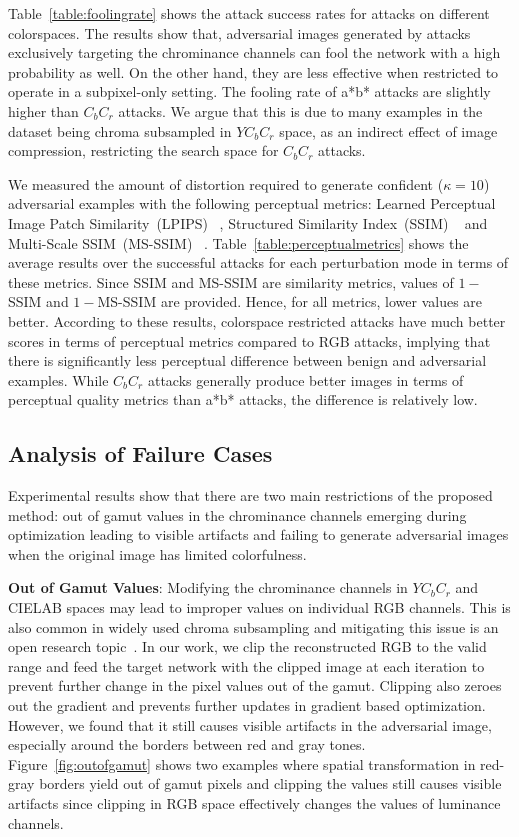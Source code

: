 Table~\ref*{table:foolingrate} shows the attack success rates for attacks on different colorspaces. The results show that, adversarial images generated by attacks exclusively targeting the chrominance channels can fool the network with a high probability as well. On the other hand, they are less effective when restricted to operate in a subpixel-only setting. The fooling rate of a*b* attacks are slightly higher than \(C_bC_r\) attacks. We argue that this is due to many examples in the dataset being chroma subsampled in \(YC_bC_r\) space, as an indirect effect of image compression, restricting the search space for \(C_bC_r\) attacks.

We measured the amount of distortion required to generate confident (\(\kappa = 10\)) adversarial examples with the following perceptual metrics: Learned Perceptual Image Patch Similarity~(LPIPS) ~\cite{zhang2018unreasonable}, Structured Similarity Index~(SSIM) ~\cite{wang2004image} and Multi-Scale SSIM~(MS-SSIM) ~\cite{wang2003multiscale}. Table~\ref{table:perceptualmetrics} shows the average results over the successful attacks for each perturbation mode in terms of these metrics. Since SSIM and MS-SSIM are similarity metrics, values of \(1-\)SSIM and \(1-\)MS-SSIM are provided. Hence, for all metrics, lower values are better. According to these results, colorspace restricted attacks have much better scores in terms of perceptual metrics compared to RGB attacks, implying that there is significantly less perceptual difference between benign and adversarial examples. While \(C_bC_r\) attacks generally produce better images in terms of perceptual quality metrics than a*b* attacks, the difference is relatively low.

\subsection{Analysis of Failure Cases}
Experimental results show that there are two main restrictions of the proposed method: out of gamut values in the chrominance channels emerging during optimization leading to visible artifacts and failing to generate adversarial images when the original image has limited colorfulness.

\textbf{Out of Gamut Values}: Modifying the chrominance channels in \(YC_{b}C_{r}\) and CIELAB spaces may lead to improper values on individual RGB channels. This is also common in widely used chroma subsampling and mitigating this issue is an open research topic~\cite{chan2008toward}. In our work, we clip the reconstructed RGB to the valid range and feed the target network with the clipped image at each iteration to prevent further change in the pixel values out of the gamut. Clipping also zeroes out the gradient and prevents further updates in gradient based optimization. However, we found that it still causes visible artifacts in the adversarial image, especially around the borders between red and gray tones. Figure~\ref{fig:outofgamut} shows two examples where spatial transformation in red-gray borders yield out of gamut pixels and clipping the values still causes visible artifacts since clipping in RGB space effectively changes the values of luminance channels.

